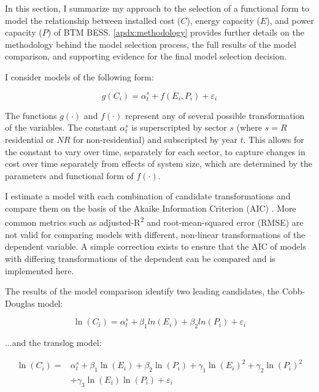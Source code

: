\documentclass[preprint,12pt,authoryear]{elsarticle}
\begin{document}
In this section, I summarize my approach to the selection of a functional form to model the relationship between installed cost ($C$), energy capacity ($E$), and power capacity ($P$) of BTM BESS. \ref{apdx:methodology} provides further details on the methodology behind the model selection process, the full results of the model comparison, and supporting evidence for the final model selection decision.

I consider models of the following form:

\begin{equation}\label{eq:generalized_equation}
    g(C_i) = \alpha^{s}_{t} + f(E_i, P_i) + \varepsilon_i
\end{equation}

The functions $g(\cdot)$ and $f(\cdot)$ represent any of several possible transformation of the variables. The constant $\alpha^{s}_{t}$ is superscripted by sector $s$ (where $s = R$ residential or $NR$ for non-residential) and subscripted by year $t$. This allows for the constant to vary over time, separately for each sector, to capture changes in cost over time separately from effects of system size, which are determined by the parameters and functional form of $f(\cdot)$.

I estimate a model with each combination of candidate transformations and compare them on the basis of the Akaike Information Criterion (AIC) \citep{akaike1974}. More common metrics such as adjusted-R\textsuperscript{2} and root-mean-squared error (RMSE) are not valid for comparing models with different, non-linear transformations of the dependent variable. A simple correction exists to ensure that the AIC of models with differing transformations of the dependent can be compared \citep[p. 224]{akaike1978} and is implemented here.

The results of the model comparison identify two leading candidates, the Cobb-Douglas \citep{cobbdouglas1928} model:

\begin{equation}\label{eq:CD}
    \ln(C_i) = \alpha^{s}_{t} + \beta_1 ln(E_i) + \beta_2 ln(P_i) + \varepsilon_i
\end{equation}

...and the translog \citep{kmenta1967} model:

\begin{equation}\label{eq:TL}
\begin{split}
    \ln(C_i) = &\alpha^{s}_{t} + \beta_1 \ln(E_i) + \beta_2 \ln(P_i) + \gamma_1 \ln(E_i)^2 + \gamma_2 \ln(P_i)^2 \\
		 & + \gamma_3 \ln(E_i) \ln(P_i) + \varepsilon_i
\end{split}
\end{equation}
\end{document}
